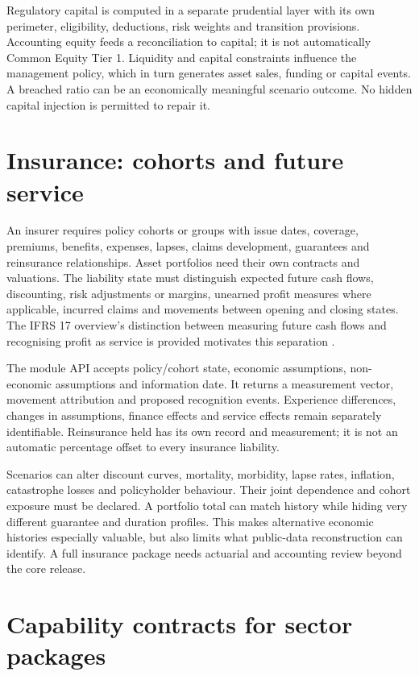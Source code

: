 Regulatory capital is computed in a separate prudential layer with its own
perimeter, eligibility, deductions, risk weights and transition provisions.
Accounting equity feeds a reconciliation to capital; it is not automatically
Common Equity Tier 1. Liquidity and capital constraints influence the
management policy, which in turn generates asset sales, funding or capital
events. A breached ratio can be an economically meaningful scenario outcome.
No hidden capital injection is permitted to repair it.

\section{Insurance: cohorts and future service}

An insurer requires policy cohorts or groups with issue dates, coverage,
premiums, benefits, expenses, lapses, claims development, guarantees and
reinsurance relationships. Asset portfolios need their own contracts and
valuations. The liability state must distinguish expected future cash flows,
discounting, risk adjustments or margins, unearned profit measures where
applicable, incurred claims and movements between opening and closing states.
The IFRS 17 overview's distinction between measuring future cash flows and
recognising profit as service is provided motivates this separation
\citep{ifrs17}.

The module API accepts policy/cohort state, economic assumptions, non-economic
assumptions and information date. It returns a measurement vector, movement
attribution and proposed recognition events. Experience differences, changes
in assumptions, finance effects and service effects remain separately
identifiable. Reinsurance held has its own record and measurement; it is not
an automatic percentage offset to every insurance liability.

Scenarios can alter discount curves, mortality, morbidity, lapse rates,
inflation, catastrophe losses and policyholder behaviour. Their joint
dependence and cohort exposure must be declared. A portfolio total can match
history while hiding very different guarantee and duration profiles. This
makes alternative economic histories especially valuable, but also limits
what public-data reconstruction can identify. A full insurance package needs
actuarial and accounting review beyond the core release.

\clearpage
\section{Capability contracts for sector packages}

